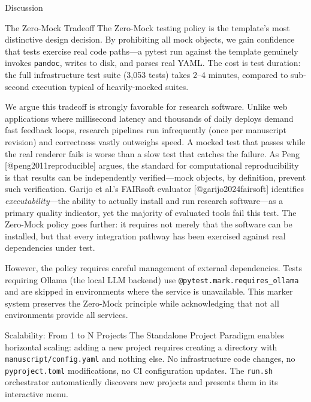 \documentclass[
  ignorenonframetext,
]{beamer}
\author{\texorpdfstring{}{}}
\date{}
\begin{document}
\begin{frame}[fragile]{Discussion}
\protect{}\label{discussion}
\begin{block}{The Zero-Mock Tradeoff}
\protect{}\label{the-zero-mock-tradeoff}
The Zero-Mock testing policy is the template's most distinctive design
decision. By prohibiting all mock objects, we gain confidence that tests
exercise real code paths---a pytest run against the template genuinely
invokes \texttt{pandoc}, writes to disk, and parses real YAML. The cost
is test duration: the full infrastructure test suite (3,053 tests) takes
2--4 minutes, compared to sub-second execution typical of heavily-mocked
suites.

We argue this tradeoff is strongly favorable for research software.
Unlike web applications where millisecond latency and thousands of daily
deploys demand fast feedback loops, research pipelines run infrequently
(once per manuscript revision) and correctness vastly outweighs speed. A
mocked test that passes while the real renderer fails is worse than a
slow test that catches the failure. As Peng {[}@peng2011reproducible{]}
argues, the standard for computational reproducibility is that results
can be independently verified---mock objects, by definition, prevent
such verification. Garijo et al.'s FAIRsoft evaluator
{[}@garijo2024fairsoft{]} identifies \emph{executability}---the ability
to actually install and run research software---as a primary quality
indicator, yet the majority of evaluated tools fail this test. The
Zero-Mock policy goes further: it requires not merely that the software
can be installed, but that every integration pathway has been exercised
against real dependencies under test.

However, the policy requires careful management of external
dependencies. Tests requiring Ollama (the local LLM backend) use
\texttt{@pytest.mark.requires\_ollama} and are skipped in environments
where the service is unavailable. This marker system preserves the
Zero-Mock principle while acknowledging that not all environments
provide all services.
\end{block}

\begin{block}{Scalability: From 1 to N Projects}
\protect{}\label{scalability-from-1-to-n-projects}
The Standalone Project Paradigm enables horizontal scaling: adding a new
project requires creating a directory with
\texttt{manuscript/config.yaml} and nothing else. No infrastructure code
changes, no \texttt{pyproject.toml} modifications, no CI configuration
updates. The \texttt{run.sh} orchestrator automatically discovers new
projects and presents them in its interactive menu.


\end{block}
\end{frame}
\end{document}
